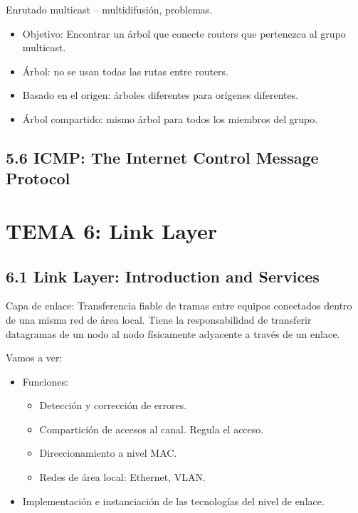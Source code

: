 \documentclass[12pt, twoside, openright]{report} %
\begin{document}
	Enrutado multicast -- multidifusión, problemas.

    \begin{itemize}
    \item
      Objetivo: Encontrar un árbol que conecte routers que pertenezca al
      grupo multicast.
    \item
      Árbol: no se usan todas las rutas entre routers.
    \item
      Basado en el origen: árboles diferentes para orígenes diferentes.
    \item
      Árbol compartido: mismo árbol para todos los miembros del grupo.
    \end{itemize}

\section{5.6 ICMP: The Internet Control Message Protocol}


\chapter{TEMA 6: Link Layer}

\section{6.1 Link Layer: Introduction and Services}

    Capa de enlace: Transferencia fiable de tramas entre equipos
    conectados dentro de una misma red de área local. Tiene la
    responsabilidad de transferir datagramas de un nodo al nodo
    físicamente adyacente a través de un enlace.

    Vamos a ver:

    \begin{itemize}
    \item
      Funciones:

      \begin{itemize}
      \item
        Detección y corrección de errores.
      \item
        Compartición de accesos al canal. Regula el acceso.
      \item
        Direccionamiento a nivel MAC.
      \item
        Redes de área local: Ethernet, VLAN.
      \end{itemize}
    \item
      Implementación e instanciación de las tecnologías del nivel de
      enlace.
    \end{itemize}
\end{document}
